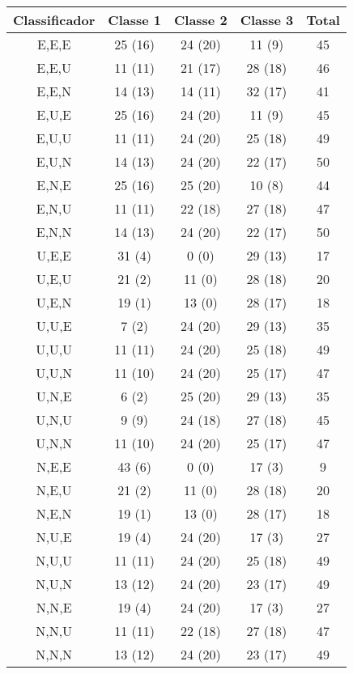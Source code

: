 \documentclass[a4paper,11pt]{article}
\begin{document}
  \begin{tabular}{|c|c|c|c|c|}
    \hline
    Classificador  & Classe 1 & Classe 2 & Classe 3 & Total \\
    \hline
        E,E,E      &  25 (16) &  24 (20) &  11 (9)  &  45 \\
        E,E,U      &  11 (11) &  21 (17) &  28 (18) &  46 \\
        E,E,N      &  14 (13) &  14 (11) &  32 (17) &  41 \\
        E,U,E      &  25 (16) &  24 (20) &  11 (9)  &  45 \\
        E,U,U      &  11 (11) &  24 (20) &  25 (18) &  49 \\
        E,U,N      &  14 (13) &  24 (20) &  22 (17) &  50 \\
        E,N,E      &  25 (16) &  25 (20) &  10 (8)  &  44 \\
        E,N,U      &  11 (11) &  22 (18) &  27 (18) &  47 \\
        E,N,N      &  14 (13) &  24 (20) &  22 (17) &  50 \\
        U,E,E      &  31 (4)  &   0 (0)  &  29 (13) &  17 \\
        U,E,U      &  21 (2)  &  11 (0)  &  28 (18) &  20 \\
        U,E,N      &  19 (1)  &  13 (0)  &  28 (17) &  18 \\
        U,U,E      &   7 (2)  &  24 (20) &  29 (13) &  35 \\
        U,U,U      &  11 (11) &  24 (20) &  25 (18) &  49 \\
        U,U,N      &  11 (10) &  24 (20) &  25 (17) &  47 \\
        U,N,E      &   6 (2)  &  25 (20) &  29 (13) &  35 \\
        U,N,U      &   9 (9)  &  24 (18) &  27 (18) &  45 \\
        U,N,N      &  11 (10) &  24 (20) &  25 (17) &  47 \\
        N,E,E      &  43 (6)  &   0 (0)  &  17 (3)  &   9 \\
        N,E,U      &  21 (2)  &  11 (0)  &  28 (18) &  20 \\
        N,E,N      &  19 (1)  &  13 (0)  &  28 (17) &  18 \\
        N,U,E      &  19 (4)  &  24 (20) &  17 (3)  &  27 \\
        N,U,U      &  11 (11) &  24 (20) &  25 (18) &  49 \\
        N,U,N      &  13 (12) &  24 (20) &  23 (17) &  49 \\
        N,N,E      &  19 (4)  &  24 (20) &  17 (3)  &  27 \\
        N,N,U      &  11 (11) &  22 (18) &  27 (18) &  47 \\
        N,N,N      &  13 (12) &  24 (20) &  23 (17) &  49 \\
    \hline
  \end{tabular}
  
\end{document}

